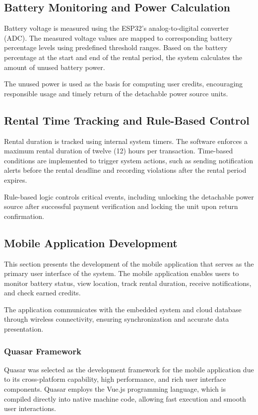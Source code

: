 {\subsection{Battery Monitoring and Power Calculation}
Battery voltage is measured using the ESP32’s analog-to-digital converter (ADC). The measured voltage values are mapped to corresponding battery percentage levels using predefined threshold ranges. Based on the battery percentage at the start and end of the rental period, the system calculates the amount of unused battery power.

The unused power is used as the basis for computing user credits, encouraging responsible usage and timely return of the detachable power source units.

\subsection{Rental Time Tracking and Rule-Based Control}
Rental duration is tracked using internal system timers. The software enforces a maximum rental duration of twelve (12) hours per transaction. Time-based conditions are implemented to trigger system actions, such as sending notification alerts before the rental deadline and recording violations after the rental period expires.

Rule-based logic controls critical events, including unlocking the detachable power source after successful payment verification and locking the unit upon return confirmation.

\subsection{Mobile Application Development}
This section presents the development of the mobile application that serves as the primary user interface of the system. The mobile application enables users to monitor battery status, view location, track rental duration, receive notifications, and check earned credits.

The application communicates with the embedded system and cloud database through wireless connectivity, ensuring synchronization and accurate data presentation.

\subsubsection{Quasar Framework}
Quasar was selected as the development framework for the mobile application due to its cross-platform capability, high performance, and rich user interface components. Quasar employs the Vue.js programming language, which is compiled directly into native machine code, allowing fast execution and smooth user interactions.

}
